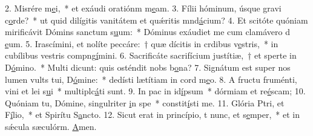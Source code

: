 2. Misrére m\uline{e}i,~* et exáudi oratiónm m\uline{e}am.
3. Fílii hóminum, úsque gravi c\uline{o}rde?~* ut quid dilígitis vanitátem et quǽritis mnd\uline{á}cium?
4. Et scitóte quóniam mirificávit Dómins sanctum s\uline{u}um:~* Dóminus exáudiet me cum clamávero d \uline{e}um.
5. Irascímini, et nolíte peccáre:~† quæ dícitis in crdibus v\uline{e}stris,~* in cubílibus vestris compng\uline{í}mini.
6. Sacrificáte sacrifícium justítiæ,~† et sperte in D\uline{ó}mino.~* Multi dicunt: quis osténdit nobs b\uline{o}na?
7. Signátum est super nos lumen vults tui, D\uline{ó}mine:~* dedísti lætítiam in cord m\uline{e}o.
8. A fructu fruménti, vini et lei s\uline{u}i~* multiplc\uline{á}ti sunt.
9. In pac in id\uline{í}psum~* dórmiam et re\uline{é}scam;
10. Quóniam tu, Dómine, singulriter \uline{i}n spe~* constit\uline{í}sti me.
11. Glória Ptri, et F\uline{í}lio,~* et Spirítu S\uline{a}ncto.
12. Sicut erat in princípio, t nunc, et s\uline{e}mper,~* et in sǽcula sæculórm. \uline{A}men.
